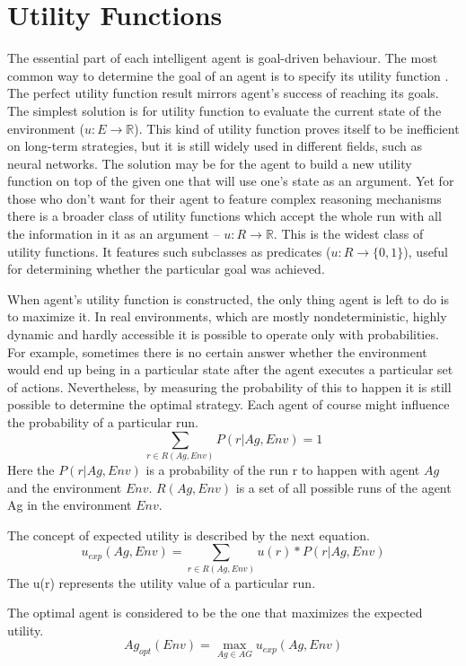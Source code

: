 \section{Utility Functions}
The essential part of each intelligent agent is goal-driven behaviour.
The most common way to determine the goal of an agent is to specify its utility function \cite{DUMMY:1}.
The perfect utility function result mirrors agent's success of reaching its goals.
The simplest solution is for utility function to evaluate the current state of the environment
(\(u: E\rightarrow \mathbb{R} \)). This kind of utility function proves itself to be inefficient on long-term strategies, but it is still widely used in different fields, such as neural networks. The solution may be for the agent to build a new utility function on top of the given one that will use one's state as an argument. Yet for those who don't want for their agent to feature complex reasoning mechanisms there is a broader class of utility functions which accept the whole run with all the information in it as an argument -- \(u: R\rightarrow \mathbb{R} \).
This is the widest class of utility functions. It features such subclasses as predicates (\(u: R\rightarrow \{0,1\} \)), useful for determining whether the particular goal was achieved.\par
When agent's utility function is constructed, the only thing agent is left to do is to maximize it.
In real environments, which are mostly nondeterministic, highly dynamic and hardly accessible it is possible to operate only with probabilities. For example, sometimes there is no certain answer whether the environment would end up being in a particular state after the agent executes a particular set of actions. Nevertheless, by measuring the probability of this to happen it is still possible to determine the optimal strategy.
Each agent of course might influence the probability of a particular run.
\[\sum_{r \in R(Ag, Env)} P (r| Ag, Env ) = 1\]
Here the \(P (r| Ag, Env )\) is a probability of the run r to happen with agent $Ag$ and the environment $Env$. \(R(Ag, Env)\) is a set of all possible runs of the agent Ag in the environment $Env$.

The concept of  expected utility is described by the next equation.
\[ u_{exp}(Ag,Env)  = \sum_{r \in R(Ag, Env)} u(r) *P (r| Ag, Env ) \]
The u(r) represents the utility value of a particular run.

The optimal agent is considered to be the one that maximizes the expected utility.
\[ Ag_{opt}(Env)  = \max_{Ag\in AG} u_{exp}(Ag,Env)\]
